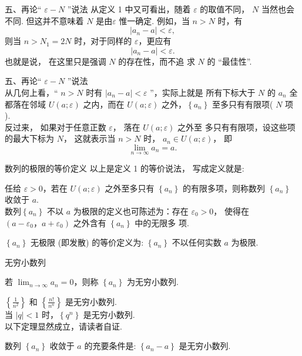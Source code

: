 \documentclass[mathserif]{beamer}
\begin{document}
\begin{frame}{五、再论`` $\varepsilon-N$ ”说法}%
	\suojin {} 从定义 1 中又可看出，随着 $\varepsilon$ 的取值不同， $N$ 当然也会不同. 但这并不意味着 $N$ 是由$\varepsilon$ 惟一确定. 例如，当 $n>N$ 时，有
	$$
	\left|a_n-a\right|<\varepsilon,
	$$
	则当 $n>N_1=2 N$ 时，对于同样的 $\varepsilon$，更应有
	$$
	\left|a_n-a\right|<\varepsilon .
	$$
	也就是说， 在这里只是强调 $N$ 的存在性，而不追 求 $N$ 的 “最佳性”.     
\end{frame}


\begin{frame}{五、再论`` $\varepsilon-N$ ”说法}%
	\suojin {}\\
	\suojin 从几何上看，“ $n>N$ 时有 $\left|a_n-a\right|<\varepsilon$ ”，实际上就是 所有下标大于 $N$ 的 $a_n$ 全都落在邻域 $U(a ; \varepsilon)$ 之内，而在 $U(a ; \varepsilon)$ 之外，$\left\{a_n\right\}$ 至多只有有限项( $N$ 项 ). \\
	\suojin 反过来， 如果对于任意正数 $\varepsilon$， 落在 $U(a ; \varepsilon)$ 之外至 多只有有限项，设这些项的最大下标为 $N$， 这就表示当 $n>N$ 时， $a_n \in U(a ; \varepsilon)$， 即 
	$$\lim _{n \rightarrow \infty} a_n=a.$$
	
\end{frame}


\begin{frame}{数列的极限的等价定义}%
		\suojin 以上是定义 1 的等价说法， 写成定义就是:\\
	\begin{dfn}[$1^{\prime}$]
		\suojin 任给 $\varepsilon>0$，若在 $U(a ; \varepsilon)$ 之外至多只有 $\left\{a_n\right\}$ 的有限多项，则称数列 $\left\{a_n\right\}$ 收敛于 $a$. \\
		\suojin 数列$\left\{a_n\right\}$ 不以 $a$ 为极限的定义也可陈述为：存在 $\varepsilon_0>0$， 使得在 $\left(a-\varepsilon_0， a+\varepsilon_0\right)$ 之外含有 $\left\{a_n\right\}$ 中的无限多 项.
	\end{dfn}
\pause 
\jiange
	\begin{alertblock}{}
		\suojin {} $\left\{a_n\right\}$ 无极限 (即发散) 的等价定义为: $\left\{a_n\right\}$ 不以任何实数 $a$ 为极限.  
	\end{alertblock}  
	
\end{frame}


\begin{frame}{无穷小数列}%
	\begin{dfn}
		\suojin 若 $\lim _{n \rightarrow \infty} a_n=0$，则称 $\left\{a_n\right\}$ 为无穷小数列.
	\end{dfn}    
	\suojin {} $\left\{\frac{1}{n^2}\right\}$ 和 $\left\{\frac{n !}{n^n}\right\}$ 是无穷小数列. \\
	\suojin \suojin 当 $|q|<1$ 时，$\left\{q^n\right\}$ 是无穷小数列.\\ \jiange\pause
	以下定理显然成立，请读者自证.\\
	\begin{thm}
		数列 $\left\{a_n\right\}$ 收敛于 $a$ 的充要条件是: $\left\{a_n-a\right\}$ 是无穷小数列.
	\end{thm} 
\end{frame}
\end{document}
